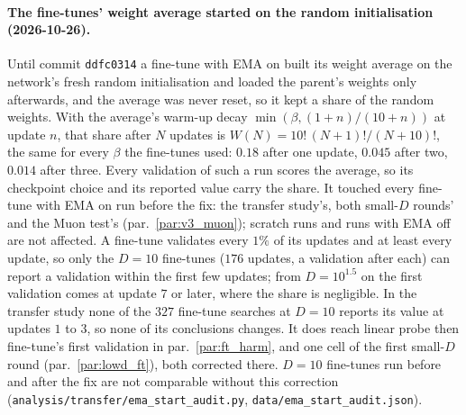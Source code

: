\documentclass[11pt]{article}
\newcommand{\code}[1]{\texttt{#1}}
\begin{document}
\paragraph{The fine-tunes' weight average started on the random initialisation (2026-10-26).}\label{par:ema_start}
Until commit \code{ddfc0314} a fine-tune with EMA on built its weight average on the network's fresh random
initialisation and loaded the parent's weights only afterwards, and the average was never reset, so it kept a share of
the random weights. With the average's warm-up decay $\min(\beta,(1+n)/(10+n))$ at update $n$, that share after $N$
updates is $W(N)=10!\,(N+1)!/(N+10)!$, the same for every $\beta$ the fine-tunes used: $0.18$ after one update,
$0.045$ after two, $0.014$ after three. Every validation of such a run scores the average, so its checkpoint choice and
its reported value carry the share. It touched every fine-tune with EMA on run before the fix: the transfer study's,
both small-$D$ rounds' and the Muon test's (par.~\ref{par:v3_muon}); scratch runs and runs with EMA off are not
affected. A fine-tune validates every $1\%$ of its updates and at least every update, so only the $D=10$ fine-tunes
($176$ updates, a validation after each) can report a validation within the first few updates; from $D=10^{1.5}$ on
the first validation comes at update $7$ or later, where the share is negligible. In the transfer study none of the
$327$ fine-tune searches at $D=10$ reports its value at updates $1$ to $3$, so none of its conclusions changes. It does
reach linear probe then fine-tune's first validation in par.~\ref{par:ft_harm}, and one cell of the first small-$D$
round (par.~\ref{par:lowd_ft}), both corrected there. $D=10$ fine-tunes run before and after the fix are not
comparable without this correction (\code{analysis/transfer/ema\_start\_audit.py},
\code{data/ema\_start\_audit.json}).
\end{document}
